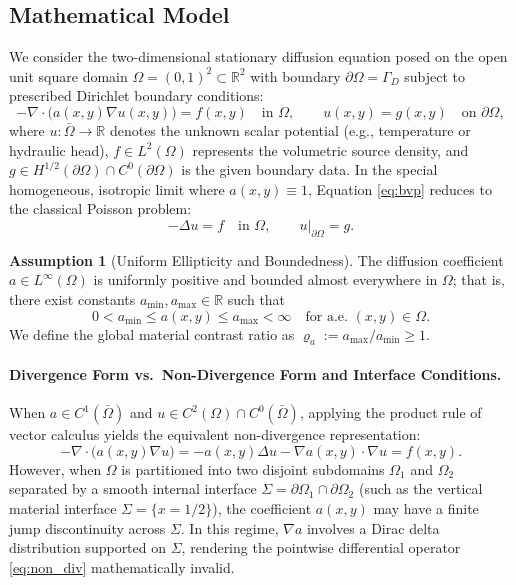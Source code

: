 \documentclass[11pt,a4paper]{article}
\theoremstyle{definition}
\newtheorem{assumption}[theorem]{Assumption}
\theoremstyle{remark}
\begin{document}
\subsection{Mathematical Model}
We consider the two-dimensional stationary diffusion equation posed on the open unit square domain $\Omega = (0,1)^2 \subset \mathbb{R}^2$ with boundary $\partial\Omega = \Gamma_D$ subject to prescribed Dirichlet boundary conditions:
\begin{equation}
    -\nabla\cdot\bigl(a(x,y)\nabla u(x,y)\bigr) = f(x,y) \quad \text{in } \Omega,
    \qquad
    u(x,y) = g(x,y) \quad \text{on } \partial\Omega,
    \label{eq:bvp}
\end{equation}
where $u: \bar{\Omega} \to \mathbb{R}$ denotes the unknown scalar potential (e.g., temperature or hydraulic head), $f \in L^2(\Omega)$ represents the volumetric source density, and $g \in H^{1/2}(\partial\Omega) \cap C^0(\partial\Omega)$ is the given boundary data. In the special homogeneous, isotropic limit where $a(x,y) \equiv 1$, Equation \eqref{eq:bvp} reduces to the classical Poisson problem:
\begin{equation}
    -\Delta u = f \quad \text{in } \Omega, \qquad u|_{\partial\Omega} = g.
    \label{eq:poisson}
\end{equation}

\begin{assumption}[Uniform Ellipticity and Boundedness]
\label{ass:ellipticity}
The diffusion coefficient $a \in L^\infty(\Omega)$ is uniformly positive and bounded almost everywhere in $\Omega$; that is, there exist constants $a_{\min}, a_{\max} \in \mathbb{R}$ such that
\begin{equation}
    0 < a_{\min} \le a(x,y) \le a_{\max} < \infty \quad \text{for a.e. } (x,y) \in \Omega.
    \label{eq:bounds_a}
\end{equation}
We define the global material contrast ratio as $\varrho_a := a_{\max} / a_{\min} \ge 1$.
\end{assumption}

\paragraph{Divergence Form vs.\ Non-Divergence Form and Interface Conditions.}
When $a \in C^1(\bar{\Omega})$ and $u \in C^2(\Omega) \cap C^0(\bar{\Omega})$, applying the product rule of vector calculus yields the equivalent non-divergence representation:
\begin{equation}
    -\nabla\cdot\bigl(a(x,y)\nabla u\bigr) = -a(x,y)\Delta u - \nabla a(x,y)\cdot\nabla u = f(x,y).
    \label{eq:non_div}
\end{equation}
However, when $\Omega$ is partitioned into two disjoint subdomains $\Omega_1$ and $\Omega_2$ separated by a smooth internal interface $\Sigma = \partial\Omega_1 \cap \partial\Omega_2$ (such as the vertical material interface $\Sigma = \{x = 1/2\}$), the coefficient $a(x,y)$ may have a finite jump discontinuity across $\Sigma$. In this regime, $\nabla a$ involves a Dirac delta distribution supported on $\Sigma$, rendering the pointwise differential operator \eqref{eq:non_div} mathematically invalid.
\end{document}
